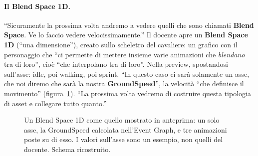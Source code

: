 \paragraph{Il Blend Space 1D.} ``Sicuramente la prossima volta andremo a vedere quelli
che sono chiamati \textbf{Blend Space}. Ve lo faccio vedere velocissimamente.'' Il
docente apre un \textbf{Blend Space 1D} (``una dimensione''), creato sullo scheletro del
cavaliere: un grafico con il personaggio che ``ci permette di mettere insieme varie
animazioni che \emph{blendano} tra di loro'', cioè ``che interpolano tra di loro''.
Nella preview, spostandosi sull'asse: idle, poi walking, poi sprint. ``In questo caso ci
sarà solamente un asse, che noi diremo che sarà la nostra \textbf{GroundSpeed}'', la
velocità ``che definisce il movimento'' (figura~\ref{ue8:fig:blendspace}). ``La prossima
volta vedremo di costruire questa tipologia di asset e collegare tutto quanto.''

\begin{figure}[htbp]
\centering
{}
\caption{Un Blend Space 1D come quello mostrato in anteprima: un solo asse, la
GroundSpeed calcolata nell'Event Graph, e tre animazioni poste su di esso. I valori
sull'asse sono un esempio, non quelli del docente. Schema ricostruito.}
\label{ue8:fig:blendspace}
\end{figure}

